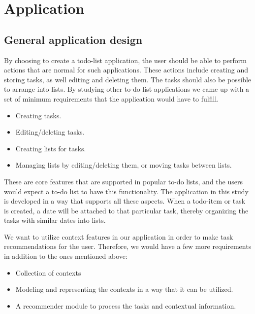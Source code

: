 \section{Application}

\subsection{General application design}
By choosing to create a todo-list application, the user should be able to perform actions that are normal for such applications. These actions include creating and storing tasks, as well editing and deleting them. The tasks should also be possible to arrange into lists. By studying other to-do list applications \cite{trello, todoist} we came up with a set of minimum requirements that the application would have to fulfill.
\begin{itemize}
	\item Creating tasks.
	\item Editing/deleting tasks.
	\item Creating lists for tasks.
	\item Managing lists by editing/deleting them, or moving tasks between lists.
\end{itemize}
These are core features that are supported in popular to-do lists, and the users would expect a to-do list to have this functionality. The application in this study is developed in a way that supports all these aspects. When a todo-item or task is created, a date will be attached to that particular task, thereby organizing the tasks with similar dates into lists.

We want to utilize context features in our application in order to make task recommendations for the user. Therefore, we would have a few more requirements in addition to the ones mentioned above:
\begin{itemize}
	\item Collection of contexts
	\item Modeling and representing the contexts in a way that it can be utilized.
	\item A recommender module to process the tasks and contextual information.
\end{itemize}


